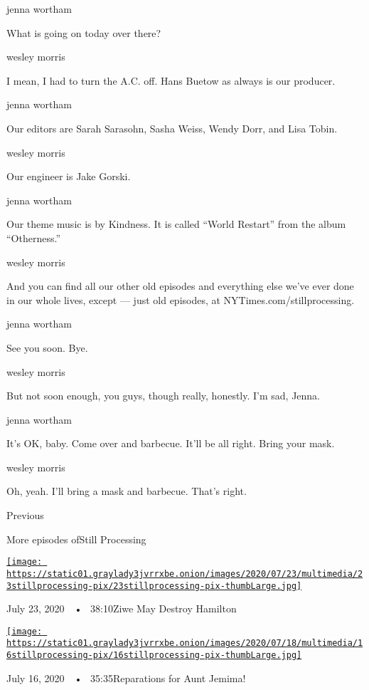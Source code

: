 jenna wortham

What is going on today over there?

wesley morris

I mean, I had to turn the A.C. off. Hans Buetow as always is our
producer.

jenna wortham

Our editors are Sarah Sarasohn, Sasha Weiss, Wendy Dorr, and Lisa Tobin.

wesley morris

Our engineer is Jake Gorski.

jenna wortham

Our theme music is by Kindness. It is called ``World Restart'' from the
album ``Otherness.''

wesley morris

And you can find all our other old episodes and everything else we've
ever done in our whole lives, except --- just old episodes, at
NYTimes.com/stillprocessing.

jenna wortham

See you soon. Bye.

wesley morris

But not soon enough, you guys, though really, honestly. I'm sad, Jenna.

jenna wortham

It's OK, baby. Come over and barbecue. It'll be all right. Bring your
mask.

wesley morris

Oh, yeah. I'll bring a mask and barbecue. That's right.

Previous

More episodes ofStill Processing

\href{https://www.nytimes3xbfgragh.onion/2020/07/23/podcasts/hamilton-ziwe-discomfort.html?action=click\&module=audio-series-bar\&region=header\&pgtype=Article}{\texttt{[image: https://static01.graylady3jvrrxbe.onion/images/2020/07/23/multimedia/23stillprocessing-pix/23stillprocessing-pix-thumbLarge.jpg]}}

July 23, 2020~~•~ 38:10Ziwe May Destroy Hamilton

\href{https://www.nytimes3xbfgragh.onion/2020/07/16/podcasts/reparations-for-aunt-jemima.html?action=click\&module=audio-series-bar\&region=header\&pgtype=Article}{\texttt{[image: https://static01.graylady3jvrrxbe.onion/images/2020/07/18/multimedia/16stillprocessing-pix/16stillprocessing-pix-thumbLarge.jpg]}}

July 16, 2020~~•~ 35:35Reparations for Aunt Jemima!

